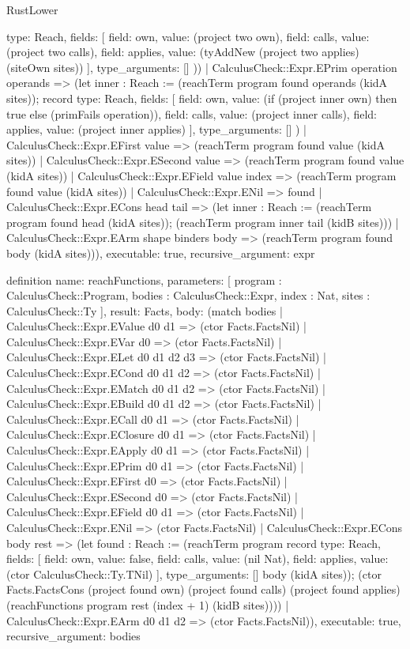 \begin{lexlean}{RustLower}
\begin{semanticmodule}
{{      type: Reach,
      fields: [
        {field: own, value: (project two own)},
        {field: calls, value: (project two calls)},
        {field: applies, value: (tyAddNew (project two applies) (siteOwn sites))}
      ],
      type_arguments: []
    }))
    | CalculusCheck::Expr.EPrim operation operands => (let inner : Reach := (reachTerm program found operands (kidA sites)); record{
      type: Reach,
      fields: [
        {field: own, value: (if (project inner own) then true else (primFails operation))},
        {field: calls, value: (project inner calls)},
        {field: applies, value: (project inner applies)}
      ],
      type_arguments: []
    })
    | CalculusCheck::Expr.EFirst value => (reachTerm program found value (kidA sites))
    | CalculusCheck::Expr.ESecond value => (reachTerm program found value (kidA sites))
    | CalculusCheck::Expr.EField value index => (reachTerm program found value (kidA sites))
    | CalculusCheck::Expr.ENil => found
    | CalculusCheck::Expr.ECons head tail => (let inner : Reach := (reachTerm program found head (kidA sites)); (reachTerm program inner tail (kidB sites)))
    | CalculusCheck::Expr.EArm shape binders body => (reachTerm program found body (kidA sites))),
  executable: true,
  recursive_argument: expr
}

definition{
  name: reachFunctions,
  parameters: [
    program : CalculusCheck::Program,
    bodies : CalculusCheck::Expr,
    index : Nat,
    sites : CalculusCheck::Ty
  ],
  result: Facts,
  body: (match bodies
    | CalculusCheck::Expr.EValue d0 d1 => (ctor Facts.FactsNil)
    | CalculusCheck::Expr.EVar d0 => (ctor Facts.FactsNil)
    | CalculusCheck::Expr.ELet d0 d1 d2 d3 => (ctor Facts.FactsNil)
    | CalculusCheck::Expr.ECond d0 d1 d2 => (ctor Facts.FactsNil)
    | CalculusCheck::Expr.EMatch d0 d1 d2 => (ctor Facts.FactsNil)
    | CalculusCheck::Expr.EBuild d0 d1 d2 => (ctor Facts.FactsNil)
    | CalculusCheck::Expr.ECall d0 d1 => (ctor Facts.FactsNil)
    | CalculusCheck::Expr.EClosure d0 d1 => (ctor Facts.FactsNil)
    | CalculusCheck::Expr.EApply d0 d1 => (ctor Facts.FactsNil)
    | CalculusCheck::Expr.EPrim d0 d1 => (ctor Facts.FactsNil)
    | CalculusCheck::Expr.EFirst d0 => (ctor Facts.FactsNil)
    | CalculusCheck::Expr.ESecond d0 => (ctor Facts.FactsNil)
    | CalculusCheck::Expr.EField d0 d1 => (ctor Facts.FactsNil)
    | CalculusCheck::Expr.ENil => (ctor Facts.FactsNil)
    | CalculusCheck::Expr.ECons body rest => (let found : Reach := (reachTerm program record{
      type: Reach,
      fields: [
        {field: own, value: false},
        {field: calls, value: (nil Nat)},
        {field: applies, value: (ctor CalculusCheck::Ty.TNil)}
      ],
      type_arguments: []
    } body (kidA sites)); (ctor Facts.FactsCons (project found own) (project found calls) (project found applies) (reachFunctions program rest (index + 1) (kidB sites))))
    | CalculusCheck::Expr.EArm d0 d1 d2 => (ctor Facts.FactsNil)),
  executable: true,
  recursive_argument: bodies
}


\end{semanticmodule}
\end{lexlean}
